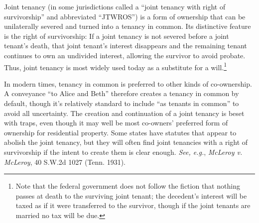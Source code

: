 Joint tenancy (in some jurisdictions called a ``joint tenancy with right of
survivorship'' and abbreviated ``JTWROS'') is a form of ownership that can be
unilaterally severed and turned into a tenancy in common. Its distinctive
feature is the right of survivorship: If a joint tenancy is not severed before
a joint tenant's death, that joint tenant's interest disappears and the
remaining tenant continues to own an undivided interest, allowing the survivor
to avoid probate. Thus, joint tenancy is most widely used today as a
substitute for a will.\footnote{Note that the federal government does not
follow the fiction that nothing passes at death to the surviving joint tenant;
the decedent's interest will be taxed as if it were transferred to the
survivor, though if the joint tenants are married no tax will be due.}

In modern times, tenancy in common is preferred to other kinds of co-ownership.
A conveyance ``to Alice and Beth'' therefore creates a tenancy in common by
default, though it's relatively standard to include ``as tenants in common'' to
avoid all uncertainty. The creation and continuation of a joint tenancy is
beset with traps, even though it may well be most co-owners' preferred form of
ownership for residential property. Some states have statutes that appear to
abolish the joint tenancy, but they will often find joint tenancies with a right
of survivorship if the intent to create them is clear enough. \emph{See, e.g.},
\emph{McLeroy v. McLeroy}, 40 S.W.2d 1027 (Tenn. 1931).


